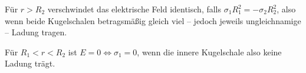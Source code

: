 \begin{enumerate}[(a)]
Für $r>R_2$ verschwindet das elektrische Feld identisch, falls $\sigma_1 R_1^2 = - \sigma_2 R_2^2$, also wenn beide Kugelschalen betragsmäßig gleich viel -- jedoch jeweils ungleichnamige -- Ladung tragen.

Für $R_1 < r < R_2$ ist $E=0\iff\sigma_1= 0$, wenn die innere Kugelschale also keine Ladung trägt.
\end{enumerate}